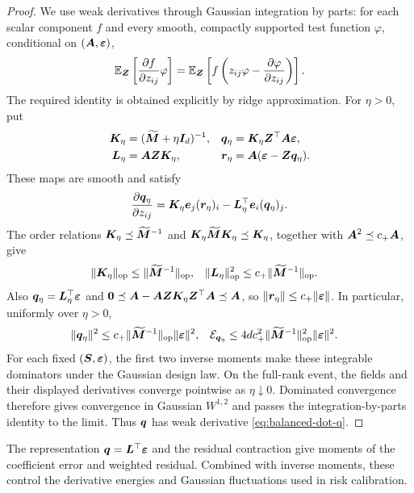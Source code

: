 \documentclass{article}
\theoremstyle{plain} %
\theoremstyle{definition} %
\theoremstyle{definition} %
\begin{document}
\begin{proof}
We use weak derivatives through Gaussian integration by parts: for each
scalar component $f$ and every smooth, compactly supported test function
$\varphi$, conditional on $(\boldsymbol{A},{\boldsymbol{\varepsilon} })$,
\begin{align*}
    {\mathbb{E}}_{\boldsymbol{Z}}\left[\pdv{f}{z_{ij}}\varphi\right]
    ={\mathbb{E}}_{\boldsymbol{Z}}\left[f\left(z_{ij}\varphi-\pdv{\varphi}{z_{ij}}\right)\right].
\end{align*}
The required identity is obtained explicitly by ridge approximation.
For $\eta>0$, put
\begin{align*}
    \boldsymbol{K}_\eta&=(\widetilde{\boldsymbol{M}}+\eta\boldsymbol{I}_d)^{-1},
    & \boldsymbol{q}_\eta&=\boldsymbol{K}_\eta\boldsymbol{Z}^\top\boldsymbol{A}{\boldsymbol{\varepsilon} },\\
    \boldsymbol{L}_\eta&=\boldsymbol{A}\boldsymbol{Z}\boldsymbol{K}_\eta,
    & \boldsymbol{r}_\eta&=\boldsymbol{A}({\boldsymbol{\varepsilon} }-\boldsymbol{Z}\boldsymbol{q}_\eta).
\end{align*}
These maps are smooth and satisfy
\begin{align*}
    \pdv{\boldsymbol{q}_\eta}{z_{ij}}
    =\boldsymbol{K}_\eta\boldsymbol{e}_j(\boldsymbol{r}_\eta)_i
      -\boldsymbol{L}_\eta^\top\boldsymbol{e}_i(\boldsymbol{q}_\eta)_j.
\end{align*}
The order relations $\boldsymbol{K}_\eta\preceq\widetilde{\boldsymbol{M}}^{-1}$ and
$\boldsymbol{K}_\eta\widetilde{\boldsymbol{M}}\boldsymbol{K}_\eta\preceq\boldsymbol{K}_\eta$, together with
$\boldsymbol{A}^2\preceq c_+\boldsymbol{A}$, give
\begin{align*}
    \lVert\boldsymbol{K}_\eta\rVert_{\rm op}
    &\leq\lVert\widetilde{\boldsymbol{M}}^{-1}\rVert_{\rm op},
    &
    \lVert\boldsymbol{L}_\eta\rVert_{\rm op}^2
    &\leq c_+\lVert\widetilde{\boldsymbol{M}}^{-1}\rVert_{\rm op}.
\end{align*}
Also $\boldsymbol{q}_\eta=\boldsymbol{L}_\eta^\top{\boldsymbol{\varepsilon} }$ and
$\mathbf{0}\preceq\boldsymbol{A}-\boldsymbol{A}\boldsymbol{Z}\boldsymbol{K}_\eta\boldsymbol{Z}^\top\boldsymbol{A}\preceq\boldsymbol{A}$,
so $\lVert\boldsymbol{r}_\eta\rVert\leq c_+\lVert{\boldsymbol{\varepsilon} }\rVert$.
In particular, uniformly over $\eta>0$,
\begin{align*}
    \lVert\boldsymbol{q}_\eta\rVert^2
    &\leq c_+\lVert\widetilde{\boldsymbol{M}}^{-1}\rVert_{\rm op}\lVert{\boldsymbol{\varepsilon} }\rVert^2,
    &
    {\mathcal E}_{\boldsymbol{q}_\eta}
    &\leq4dc_+^2\lVert\widetilde{\boldsymbol{M}}^{-1}\rVert_{\rm op}^2\lVert{\boldsymbol{\varepsilon} }\rVert^2.
\end{align*}
For each fixed $(\boldsymbol{S},{\boldsymbol{\varepsilon} })$, the first two inverse moments make these
integrable dominators under the Gaussian design law. On the full-rank
event, the fields and their displayed derivatives converge pointwise as
$\eta\downarrow0$. Dominated convergence therefore gives convergence in
Gaussian $W^{1,2}$ and passes the integration-by-parts identity to the limit.
Thus $\boldsymbol{q}$ has weak derivative \eqref{eq:balanced-dot-q}.
\end{proof}

The representation $\boldsymbol{q}=\boldsymbol{L}^\top{\boldsymbol{\varepsilon} }$ and the residual contraction give
moments of the coefficient error and weighted residual. Combined with
inverse moments, these control the derivative energies and Gaussian
fluctuations used in risk calibration.
\end{document}
